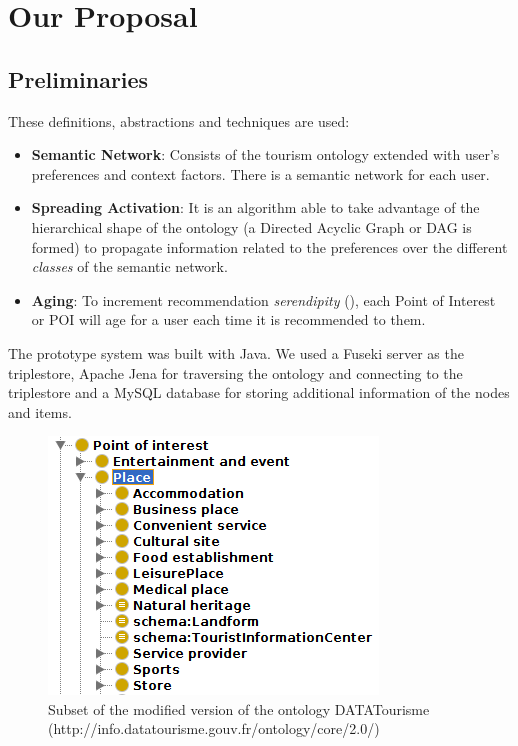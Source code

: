 \section{Our Proposal}

\subsection{Preliminaries}
These definitions, abstractions and techniques are used:
\begin{itemize}
\item \textbf{Semantic Network}: Consists of the tourism ontology extended with user's preferences and context factors. There is a semantic network for each user.
\item \textbf{Spreading Activation}: It is an algorithm able to take advantage of the hierarchical shape of the ontology (a Directed Acyclic Graph or DAG is formed) to propagate information related to the preferences over the different \textit{classes} of the semantic network.
\item \textbf{Aging}: To increment recommendation \textit{serendipity} (\cite{kotkov2016survey}), each Point of Interest or POI will age for a user each time it is recommended to them.
\end{itemize}
The prototype system was built with Java. We used a Fuseki server as the triplestore, Apache Jena for traversing the ontology and connecting to the triplestore and a MySQL database for storing additional information of the nodes and items.

\begin{figure}[h]
\centering
\includegraphics[scale=0.75]{ontology.png}
\caption{Subset of the modified version of the ontology DATATourisme (http://info.datatourisme.gouv.fr/ontology/core/2.0/)}
\label{fig:ontology}
\end{figure}

